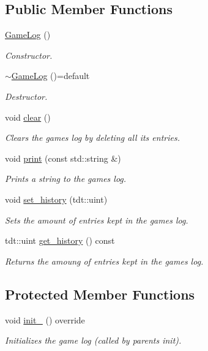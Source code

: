 \subsection*{Public Member Functions}
\begin{DoxyCompactItemize}
\item 
\hyperlink{class_game_log_ab191324ccee35626545525f4ac2d689c}{Game\+Log} ()
\begin{DoxyCompactList}\small\item\em Constructor. \end{DoxyCompactList}\item 
\hyperlink{class_game_log_a3c93bc37578b43b929cb363aa71ab29d}{$\sim$\+Game\+Log} ()=default
\begin{DoxyCompactList}\small\item\em Destructor. \end{DoxyCompactList}\item 
void \hyperlink{class_game_log_a8e8630c1d2b3899de9a90473fd46c415}{clear} ()
\begin{DoxyCompactList}\small\item\em Clears the game\textquotesingle{}s log by deleting all it\textquotesingle{}s entries. \end{DoxyCompactList}\item 
void \hyperlink{class_game_log_a007b6ad87e6278e0902789efb6518227}{print} (const std\+::string \&)
\begin{DoxyCompactList}\small\item\em Prints a string to the game\textquotesingle{}s log. \end{DoxyCompactList}\item 
void \hyperlink{class_game_log_aac1f55f5650514bfa1801e4a54c2d3ac}{set\+\_\+history} (tdt\+::uint)
\begin{DoxyCompactList}\small\item\em Sets the amount of entries kept in the game\textquotesingle{}s log. \end{DoxyCompactList}\item 
tdt\+::uint \hyperlink{class_game_log_a48daa6d325c09b6e972f5f6cab81747f}{get\+\_\+history} () const 
\begin{DoxyCompactList}\small\item\em Returns the amoung of entries kept in the game\textquotesingle{}s log. \end{DoxyCompactList}\end{DoxyCompactItemize}
\subsection*{Protected Member Functions}
\begin{DoxyCompactItemize}
\item 
void \hyperlink{class_game_log_a0b7b3e3cfc91e0b433abdfd286c22b58}{init\+\_\+} () override
\begin{DoxyCompactList}\small\item\em Initializes the game log (called by parent\textquotesingle{}s init). \end{DoxyCompactList}\end{DoxyCompactItemize}
